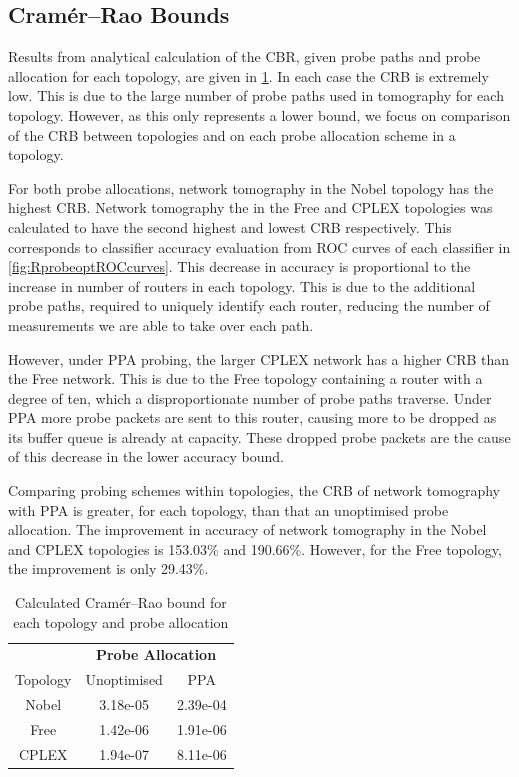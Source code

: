 \subsection{Cramér–Rao Bounds}
\label{ssec:Rloweraccuracybounds}
Results from analytical calculation of the CBR, given probe paths and probe allocation for each topology, are given in \cref{tbl:crbs}. In each case the CRB is extremely low. This is due to the large number of probe paths used in tomography for each topology. However, as this only represents a lower bound, we focus on comparison of the CRB between topologies and on each probe allocation scheme in a topology.\par
For both probe allocations, network tomography in the Nobel topology has the highest CRB. Network tomography the in the Free and CPLEX topologies was calculated to have the second highest and lowest CRB respectively. This corresponds to classifier accuracy evaluation from ROC curves of each classifier in \cref{fig:RprobeoptROCcurves}. This decrease in accuracy is proportional to the increase in number of routers in each topology. This is due to the additional probe paths, required to uniquely identify each router, reducing the number of measurements we are able to take over each path.\par
However, under PPA probing, the larger CPLEX network has a higher CRB than the Free network. This is due to the Free topology containing a router with a degree of ten, which a disproportionate number of probe paths traverse. Under PPA more probe packets are sent to this router, causing more to be dropped as its buffer queue is already at capacity. These dropped probe packets are the cause of this decrease in the lower accuracy bound.\par
Comparing probing schemes within topologies, the CRB of network tomography with PPA is greater, for each topology, than that an unoptimised probe allocation. The improvement in accuracy of network tomography in the Nobel and CPLEX topologies is 153.03\% and 190.66\%. However, for the Free topology, the improvement is only 29.43\%.\par
\begin{table}[H]
 \centering
  \begin{tabular}{@{}ccc@{}}
   \toprule
    &\multicolumn{2}{c}{\textbf{Probe Allocation}}\\
    \cmidrule(rl){2-3}
    Topology & Unoptimised & PPA \\
    \midrule
    Nobel & 3.18e-05 & 2.39e-04\\
    Free & 1.42e-06 & 1.91e-06\\
    CPLEX & 1.94e-07 & 8.11e-06\\
   \bottomrule
  \end{tabular}
  \caption{Calculated Cramér–Rao bound for each topology and probe allocation}
  \label{tbl:crbs}
\end{table}
